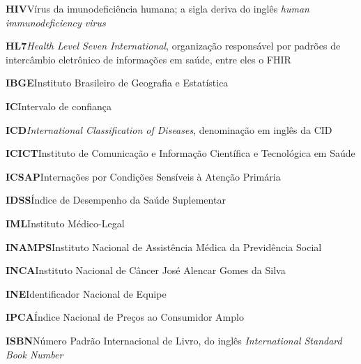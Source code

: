 \noindent\textbf{HIV}\hspace{1em}Vírus da imunodeficiência humana; a sigla deriva do inglês \emph{human immunodeficiency virus}\par\smallskip
\noindent\textbf{HL7}\hspace{1em}\emph{Health Level Seven International}, organização responsável por padrões de intercâmbio eletrônico de informações em saúde, entre eles o FHIR\par\smallskip
\noindent\textbf{IBGE}\hspace{1em}Instituto Brasileiro de Geografia e Estatística\par\smallskip
\noindent\textbf{IC}\hspace{1em}Intervalo de confiança\par\smallskip
\noindent\textbf{ICD}\hspace{1em}\emph{International Classification of Diseases}, denominação em inglês da CID\par\smallskip
\noindent\textbf{ICICT}\hspace{1em}Instituto de Comunicação e Informação Científica e Tecnológica em Saúde\par\smallskip
\noindent\textbf{ICSAP}\hspace{1em}Internações por Condições Sensíveis à Atenção Primária\par\smallskip
\noindent\textbf{IDSS}\hspace{1em}Índice de Desempenho da Saúde Suplementar\par\smallskip
\noindent\textbf{IML}\hspace{1em}Instituto Médico-Legal\par\smallskip
\noindent\textbf{INAMPS}\hspace{1em}Instituto Nacional de Assistência Médica da Previdência Social\par\smallskip
\noindent\textbf{INCA}\hspace{1em}Instituto Nacional de Câncer José Alencar Gomes da Silva\par\smallskip
\noindent\textbf{INE}\hspace{1em}Identificador Nacional de Equipe\par\smallskip
\noindent\textbf{IPCA}\hspace{1em}Índice Nacional de Preços ao Consumidor Amplo\par\smallskip
\noindent\textbf{ISBN}\hspace{1em}Número Padrão Internacional de Livro, do inglês \emph{International Standard Book Number}\par\smallskip
